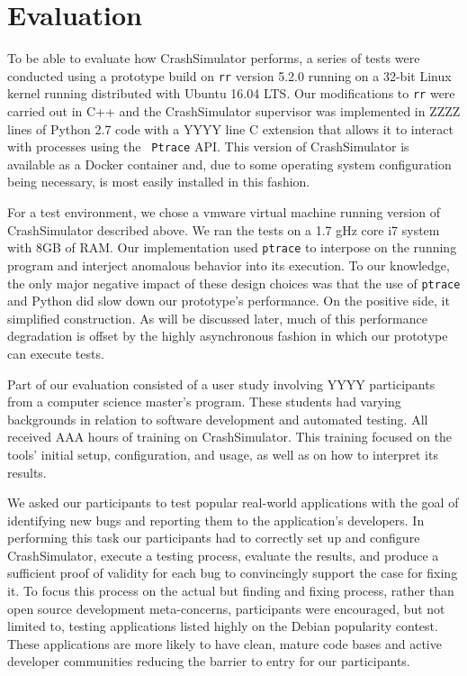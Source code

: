 \section{Evaluation}
\label{SEC:evaluation}

To be able to evaluate how CrashSimulator performs, a series of tests were
conducted using a prototype build on {\tt rr} version 5.2.0 running on a
32-bit Linux kernel running distributed with  Ubuntu 16.04 LTS.  Our
modifications to {\tt rr} were carried out in C++ and the CrashSimulator
supervisor was implemented in ZZZZ lines of Python 2.7 code with a YYYY
line C extension that allows it to interact with processes using the {\tt
Ptrace} API.  This version of CrashSimulator is available as a Docker
container and, due to some operating system configuration being necessary,
is most easily installed in this fashion.

For a test environment, we chose
a vmware virtual machine running version of CrashSimulator described above.
We ran the tests on a 1.7 gHz
core i7 system with 8GB of RAM. Our implementation used {\tt ptrace} to
interpose on the running program and interject anomalous behavior into its
execution.  To our knowledge, the only major negative impact of
these design choices was that the use of {\tt ptrace} and Python did slow
down our
prototype's performance.  On the positive side, it simplified construction.
As will be discussed later, much of this performance
degradation is offset by the highly asynchronous fashion in which our
prototype can execute tests.

Part of our evaluation consisted of a user study involving
YYYY participants from a computer science master's
program.  These students had varying backgrounds in relation to software
development and automated testing.  All received AAA hours
of training on CrashSimulator.  This training focused on the tools'
initial setup, configuration, and usage,
as well as on how to interpret its
results.

We asked our participants to test popular real-world applications with the
goal of identifying new bugs and reporting them to the application's
developers.  In performing this task our participants had to correctly set
up and configure CrashSimulator, execute a testing process, evaluate the
results, and produce a sufficient proof of validity for each bug to
convincingly support the case for fixing it.
To focus this process on the actual but finding and fixing
process, rather than open source development meta-concerns, participants
were encouraged, but not limited to, testing applications listed highly on
the Debian popularity contest.  These applications are more likely to have
clean, mature code bases and active developer communities reducing the
barrier to entry for our participants.


